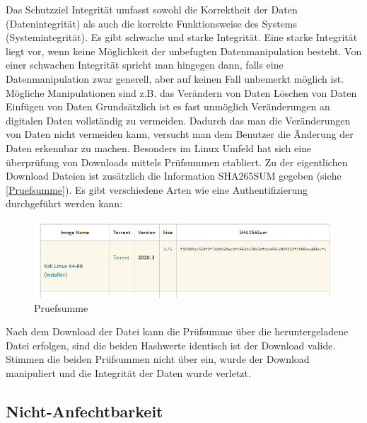 \documentclass[utf8,biblatex]{lni}
\begin{document}
Das Schutzziel Integrität umfasst sowohl die Korrektheit der Daten (Datenintegrität) 
als auch die korrekte Funktionsweise des Systems (Systemintegrität). 
Es gibt schwache und starke Integrität. 
Eine starke Integrität liegt vor, wenn keine Möglichkeit der unbefugten Datenmanipulation besteht. 
Von einer schwachen Integrität spricht man hingegen dann, falls eine Datenmanipulation zwar generell, 
aber auf keinen Fall unbemerkt möglich ist. 
Mögliche Manipulationen sind z.B. das
Verändern von Daten
Löschen von Daten
Einfügen von Daten
Grundsätzlich ist es fast unmöglich Veränderungen an digitalen Daten vollständig zu vermeiden. 
Dadurch das man die Veränderungen von Daten nicht vermeiden kann, versucht man dem Benutzer die 
Änderung der Daten erkennbar zu machen. 
Besonders im Linux Umfeld hat sich eine überprüfung von Downloads mittels Prüfsummen etabliert.
Zu der eigentlichen Download Dateien ist zusätzlich die Information \glqq SHA265SUM\grqq{ } gegeben (siehe \autoref{Pruefsumme}).
\newline
Es gibt verschiedene Arten wie eine Authentifizierung durchgeführt werden kann:
\begin{figure}
    \centering
    \includegraphics[width=\textwidth]{images/checksum_pic1.png}
    \caption[Prüfsumme]{Pruefsumme} 
    \label{Pruefsumme}
\end{figure}  
Nach dem Download der Datei kann die Prüfsumme über die heruntergeladene Datei erfolgen,
sind die beiden Hashwerte identisch ist der Download valide. 
Stimmen die beiden Prüfsummen nicht über ein, wurde der Download manipuliert und die 
Integrität der Daten wurde verletzt.

\subsection{Nicht-Anfechtbarkeit}
\end{document}
